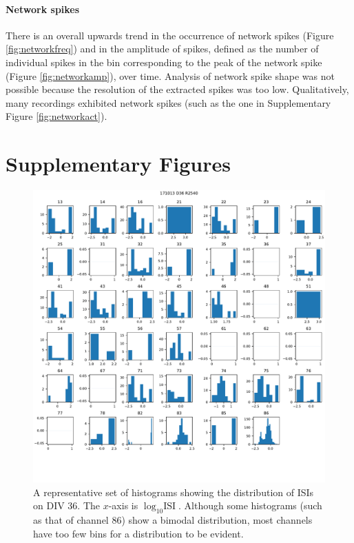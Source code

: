 \documentclass[10pt]{article}
\begin{document}
\paragraph{Network spikes} There is an overall upwards trend in the occurrence of network spikes (Figure \ref{fig:networkfreq}) and in the amplitude of spikes, defined as the number of individual spikes in the bin corresponding to the peak of the network spike (Figure \ref{fig:networkamp}), over time. Analysis of network spike shape was not possible because the resolution of the extracted spikes was too low. Qualitatively, many recordings exhibited network spikes (such as the one in Supplementary Figure \ref{fig:networkact}).




\pagebreak

\section{Supplementary Figures}
\setcounter{figure}{0}
\renewcommand{\thefigure}{S\arabic{figure}}

\begin{figure}[h!]
	\centering
	\includegraphics[width=\textwidth]{../plots/supplementary_figures/logisi_plot_example.pdf}
	\caption{A representative set of histograms showing the distribution of ISIs on DIV 36. The \(x\)-axis is \(\log_{10} \text{ISI}\). Although some histograms (such as that of channel 86) show a bimodal distribution, most channels have too few bins for a distribution to be evident.}
	\label{fig:histograms}
\end{figure}
\end{document}
